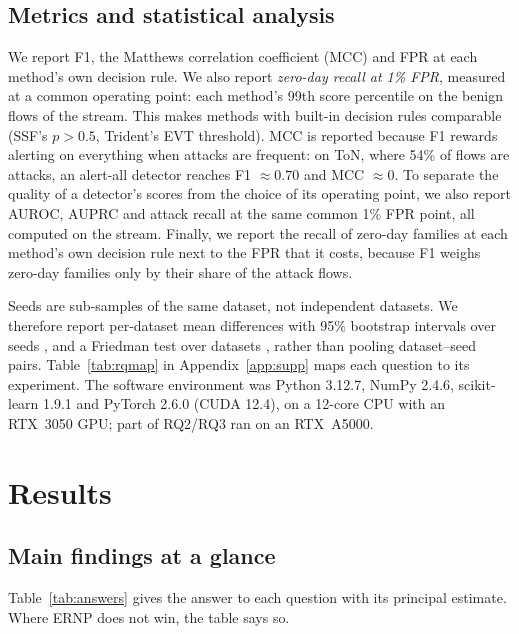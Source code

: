 \documentclass[a4paper,fleqn]{cas-dc}
\newcommand{\ERNP}{ERNP\xspace}
\begin{document}
\subsection{Metrics and statistical analysis}
We report F1, the Matthews correlation coefficient (MCC) and FPR at each method's own decision rule. We also report \emph{zero-day recall at 1\% FPR}, measured at a common operating point: each method's 99th score percentile on the benign flows of the stream. This makes methods with built-in decision rules comparable (SSF's $p>0.5$, Trident's EVT threshold). MCC is reported because F1 rewards alerting on everything when attacks are frequent: on ToN, where 54\% of flows are attacks, an alert-all detector reaches F1 $\approx0.70$ and MCC $\approx0$. To separate the quality of a detector's scores from the choice of its operating point, we also report AUROC, AUPRC and attack recall at the same common 1\% FPR point, all computed on the stream. Finally, we report the recall of zero-day families at each method's own decision rule next to the FPR that it costs, because F1 weighs zero-day families only by their share of the attack flows.

Seeds are sub-samples of the same dataset, not independent datasets. We therefore report per-dataset mean differences with 95\% bootstrap intervals over seeds \cite{efron1993bootstrap}, and a Friedman test over datasets \cite{demsar2006statistical}, rather than pooling dataset--seed pairs. Table~\ref{tab:rqmap} in Appendix~\ref{app:supp} maps each question to its experiment. The software environment was Python 3.12.7, NumPy 2.4.6, scikit-learn 1.9.1 and PyTorch 2.6.0 (CUDA 12.4), on a 12-core CPU with an RTX~3050 GPU; part of RQ2/RQ3 ran on an RTX~A5000.

\section{Results}
\label{sec:results}
\subsection{Main findings at a glance}
Table~\ref{tab:answers} gives the answer to each question with its principal estimate. Where \ERNP does not win, the table says so.
\end{document}
